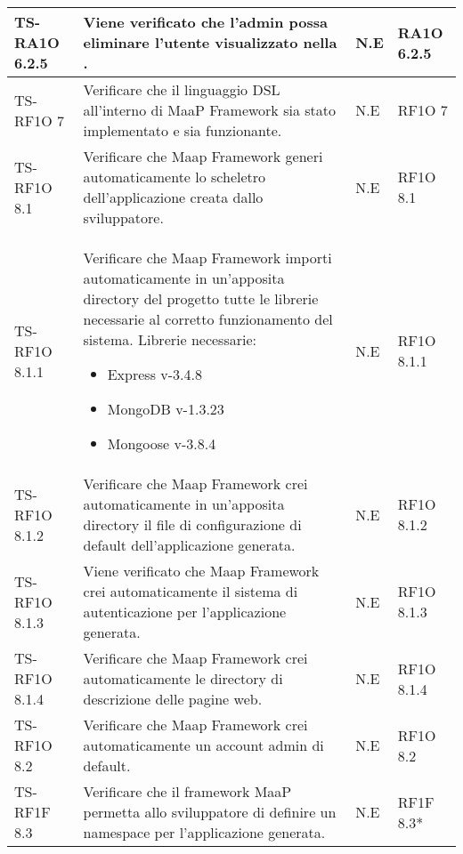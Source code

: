 \begin{center}
\begin{longtable}{| p{3cm} | p{6cm} | p{1.5cm} | p{2cm} | }
				TS-RA1O 6.2.5 & 
				Viene verificato che l'admin possa eliminare l'utente visualizzato nella \glossario{show-page}. & N.E & RA1O 6.2.5 \newline  \\ \hline 
				TS-RF1O 7 & 
				Verificare che il linguaggio DSL all'interno di MaaP Framework sia stato implementato e sia funzionante. & N.E & RF1O 7 \newline  \\ \hline 
				TS-RF1O 8.1  & 
				Verificare che Maap Framework generi automaticamente lo scheletro dell’applicazione creata dallo sviluppatore. & N.E & RF1O 8.1  \newline  \\ \hline 
				TS-RF1O 8.1.1 & 
				Verificare che Maap Framework importi automaticamente in un'apposita directory del progetto tutte le librerie necessarie al corretto funzionamento del sistema. Librerie necessarie: \begin{itemize} \item Express v-3.4.8 \item MongoDB v-1.3.23 \item Mongoose v-3.8.4 \end{itemize} & N.E & RF1O 8.1.1 \newline  \\ \hline 
				TS-RF1O 8.1.2 & 
				Verificare che Maap Framework crei automaticamente in un’apposita directory il file di configurazione di default dell’applicazione generata. & N.E & RF1O 8.1.2 \newline  \\ \hline 
				TS-RF1O 8.1.3 & 
				Viene verificato che Maap Framework crei automaticamente il sistema di autenticazione per l’applicazione generata. & N.E & RF1O 8.1.3 \newline  \\ \hline 
				TS-RF1O 8.1.4 & 
				Verificare che Maap Framework crei automaticamente le directory di descrizione delle pagine web. & N.E & RF1O 8.1.4 \newline  \\ \hline 
				TS-RF1O 8.2 & 
				Verificare che Maap Framework crei automaticamente un account admin di default. & N.E & RF1O 8.2 \newline  \\ \hline 
				TS-RF1F 8.3 & 
				Verificare che il framework MaaP permetta allo sviluppatore di definire un namespace per l’applicazione generata. & N.E & RF1F 8.3*  \newline  \\ \hline 

\end{longtable}
\end{center}
